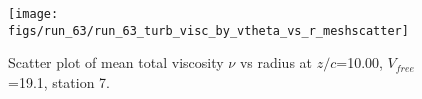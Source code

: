 \begin{figure}[H]
\centering
\texttt{[image: figs/run\_63/run\_63\_turb\_visc\_by\_vtheta\_vs\_r\_meshscatter]}
\caption{Scatter plot of mean total viscosity $\nu$ vs radius at $z/c$=10.00, $V_{free}$=19.1, station 7.}
\label{fig:run_63_turb_visc_by_vtheta_vs_r_meshscatter}
\end{figure}



